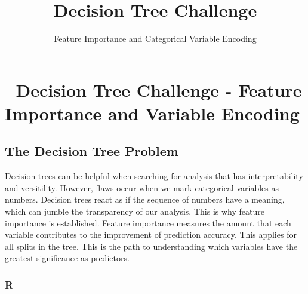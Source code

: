\documentclass[
  letterpaper,
  DIV=11,
  numbers=noendperiod]{scrartcl}
\title{Decision Tree Challenge}
\subtitle{Feature Importance and Categorical Variable Encoding}
\author{}
\date{}
\begin{document}
\maketitle


\section{🌳 Decision Tree Challenge - Feature Importance and Variable
Encoding}\label{decision-tree-challenge---feature-importance-and-variable-encoding}

\subsection{The Decision Tree Problem
🎯}\label{the-decision-tree-problem}

Decision trees can be helpful when searching for analysis that has
interpretability and versitility. However, flaws occur when we mark
categorical variables as numbers. Decision trees react as if the
sequence of numbers have a meaning, which can jumble the transparency of
our analysis. This is why feature importance is established. Feature
importance measures the amount that each variable contributes to the
improvement of prediction accuracy. This applies for all splits in the
tree. This is the path to understanding which variables have the
greatest significance as predictors.

\subsubsection{R}\label{r}
\end{document}
